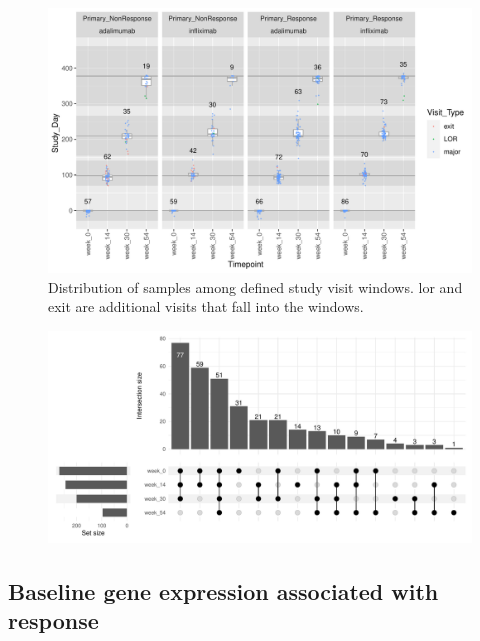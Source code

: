 \begin{outline}
\begin{figure}
    \centering
    \includegraphics[width=1.0\textwidth,page=1]{mainmatter/figures/chapter_04/process_pheno.pheno_filtered_dge.Study_Day_vs_Visit_Label.pdf}
    \caption{Distribution of samples among defined study visit windows. lor and exit are additional visits that fall into the windows.}
    \label{fig:multipants_studyDay_boxplots}
\end{figure}

\begin{figure}
    \centering
    \includegraphics[width=1.0\textwidth,page=1]{mainmatter/figures/chapter_04/process_pheno.pheno_filtered_dge.Visit_Label_upset.pdf}
    \caption{}
    \label{fig:multipants_visits_upset}
\end{figure}



\subsection{Baseline gene expression associated with response}


\end{outline}
